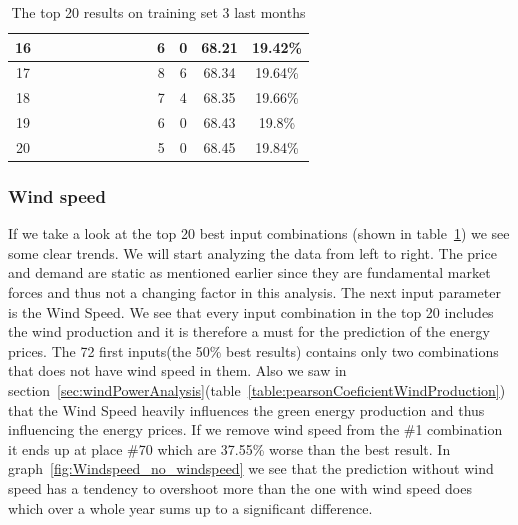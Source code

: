 \begin{table}[H]
{\begin{tabular}{|c|c|c|c|c|c|c|c|c|c|c|c|c|}
16 &  \x    & \x    & \x    &       & \x    & \x    &       & \x    & 6  & 0  & 68.21 & 19.42\% \\ \hline
17 &  \x    & \x    & \x    &       & \x\m  & \x\m  &       &       & 8  & 6  & 68.34 & 19.64\% \\ \hline
18 &  \x    & \x    & \x    &       & \x\m  &       &       & \x\m  & 7  & 4  & 68.35 & 19.66\% \\ \hline
19 &  \x    & \x    & \x    & \x    & \x    & \x    & \x    &       & 6  & 0  & 68.43 & 19.8\% \\ \hline
20 &  \x    & \x    & \x    & \x    & \x    &       &       & \x\m  & 5  & 0  & 68.45 & 19.84\% \\ \hline
\end{tabular}
}
\caption{The top 20 results on training set 3 last months} %
\label{table:Top20Prices} %
\end{table}

\subsubsection{Wind speed}
If we take a look at the top 20 best input combinations (shown in table~\ref{table:Top20Prices}) we see some clear trends. We will start analyzing the data from left to right. The price and demand are static as mentioned earlier since they are fundamental market forces and thus not a changing factor in this analysis. The next input parameter is the Wind Speed. We see that every input combination in the top 20 includes the wind production and it is therefore a must for the prediction of the energy prices. The 72 first inputs(the 50\% best results) contains only two combinations that does not have wind speed in them. Also we saw in section~\ref{sec:windPowerAnalysis}(table~\ref{table:pearsonCoeficientWindProduction}) that the Wind Speed heavily influences the green energy production and thus influencing the energy prices. If we remove wind speed from the \#1 combination it ends up at place \#70 which are 37.55\% worse than the best result. In graph~\ref{fig:Windspeed_no_windspeed} we see that the prediction without wind speed has a tendency to overshoot more than the one with wind speed does which over a whole year sums up to a significant difference. 

